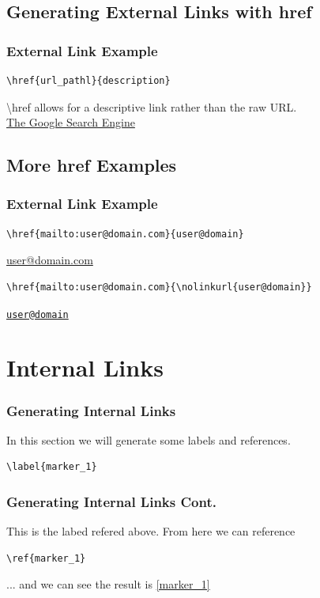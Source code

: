 \documentclass[10pt]{beamer}
\begin{document}
\subsection{Generating External Links with href}
\begin{frame}[fragile]
\frametitle{External Link Example}
\begin{verbatim}\href{url_pathl}{description}
\end{verbatim}
\textbackslash href allows for a descriptive link rather than the raw URL.
\\[15pt]
\href{http://www.google.com}{The Google Search Engine}
\end{frame}

\subsection{More href Examples}
\begin{frame}[fragile]
\frametitle{External Link Example}
\begin{verbatim}\href{mailto:user@domain.com}{user@domain}
\end{verbatim}
\href{mailto:user@domain.com}{user@domain.com}
\begin{verbatim}\href{mailto:user@domain.com}{\nolinkurl{user@domain}}
\end{verbatim}
\href{mailto:user@domain.com}{\nolinkurl{user@domain}}
\end{frame}

\section{Internal Links}
\begin{frame}[fragile]
\frametitle{Generating Internal Links}
In this section we will generate some labels and references.
\begin{verbatim}\label{marker_1}
\end{verbatim}
\label{marker_1}
\end{frame}

\begin{frame}[fragile]
\frametitle{Generating Internal Links Cont.}
This is the labed refered above. From here we can reference \begin{verbatim}\ref{marker_1}
\end{verbatim}
... and we can see the result is \ref{marker_1}
\end{frame}
\end{document}
